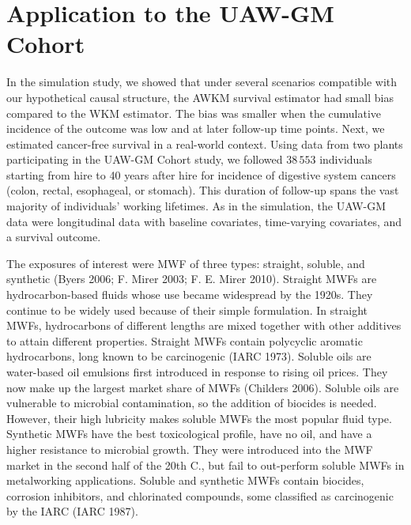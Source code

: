 \documentclass[
  11pt,
]{article}
\begin{document}
\hypertarget{application-to-the-uaw-gm-cohort}{%
\section{Application to the UAW-GM
Cohort}\label{application-to-the-uaw-gm-cohort}}

In the simulation study, we showed that under several scenarios
compatible with our hypothetical causal structure, the AWKM survival
estimator had small bias compared to the WKM estimator. The bias was
smaller when the cumulative incidence of the outcome was low and at
later follow-up time points. Next, we estimated cancer-free survival in
a real-world context. Using data from two plants participating in the
UAW-GM Cohort study, we followed \(38\,553\) individuals starting from
hire to 40 years after hire for incidence of digestive system cancers
(colon, rectal, esophageal, or stomach). This duration of follow-up
spans the vast majority of individuals' working lifetimes. As in the
simulation, the UAW-GM data were longitudinal data with baseline
covariates, time-varying covariates, and a survival outcome.

The exposures of interest were MWF of three types: straight, soluble,
and synthetic (Byers 2006; F. Mirer 2003; F. E. Mirer 2010). Straight
MWFs are hydrocarbon-based fluids whose use became widespread by the
1920s. They continue to be widely used because of their simple
formulation. In straight MWFs, hydrocarbons of different lengths are
mixed together with other additives to attain different properties.
Straight MWFs contain polycyclic aromatic hydrocarbons, long known to be
carcinogenic (IARC 1973). Soluble oils are water-based oil emulsions
first introduced in response to rising oil prices. They now make up the
largest market share of MWFs (Childers 2006). Soluble oils are
vulnerable to microbial contamination, so the addition of biocides is
needed. However, their high lubricity makes soluble MWFs the most
popular fluid type. Synthetic MWFs have the best toxicological profile,
have no oil, and have a higher resistance to microbial growth. They were
introduced into the MWF market in the second half of the 20th C., but
fail to out-perform soluble MWFs in metalworking applications. Soluble
and synthetic MWFs contain biocides, corrosion inhibitors, and
chlorinated compounds, some classified as carcinogenic by the IARC (IARC
1987).
\end{document}
